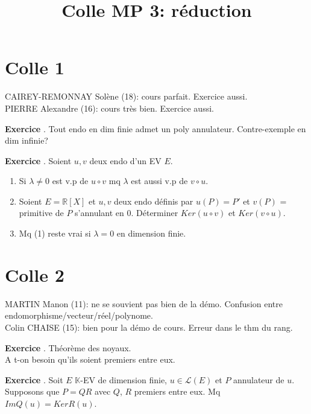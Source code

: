 \documentclass[10pt,a4paper]{article}
\title{Colle MP 3: réduction}
\newcounter{question}
\newcounter{exo}
\newenvironment{exo}{\vspace{0.5cm}\setcounter{question}{0}\addtocounter{exo}{1} \noindent \textbf{Exercice \theexo}. \normalsize }{\par}
\begin{document}
	\maketitle
	
	\section*{Colle 1}
	CAIREY-REMONNAY Solène (18): cours parfait. Exercice aussi.\\
	PIERRE Alexandre (16): cours très bien. Exercice aussi.\\
	
	\begin{exo}
		Tout endo en dim finie admet un poly annulateur. Contre-exemple en dim infinie?
	\end{exo}

	\begin{exo}
		Soient $u, v$ deux endo d'un EV $E$.
		\begin{enumerate}
			\item Si $\lambda \neq 0$ est v.p de $u \circ v$ mq $\lambda$ est aussi v.p de $v \circ u$.
			\item Soient $E =\mathbb{R}[X]$ et $u, v$ deux endo définis par $u(P) = P'$ et $v(P)$ = primitive de $P$ s'annulant en 0.
			Déterminer $Ker(u \circ v)$ et $Ker(v \circ u)$.
			\item Mq (1) reste vrai si $\lambda = 0$ en dimension finie.
		\end{enumerate}
	\end{exo}

	\section*{Colle 2}
	\setcounter{exo}{0}
	MARTIN Manon (11): ne se souvient pas bien de la démo. Confusion entre endomorphisme/vecteur/réel/polynome.\\
	Colin CHAISE (15): bien pour la démo de cours. Erreur dans le thm du rang.\\
	
	\begin{exo}
		Théorème des noyaux.\\
		A t-on besoin qu'ils soient premiers entre eux.
	\end{exo}

	\begin{exo}
		Soit $E$ $\mathbb{K}$-EV de dimension finie, $u \in \mathcal{L}(E)$ et $P$ annulateur de $u$. Supposons que $P = QR$ avec $Q$, $R$ premiers entre eux. Mq $Im Q(u) = Ker R(u)$.
	\end{exo}
\end{document}
